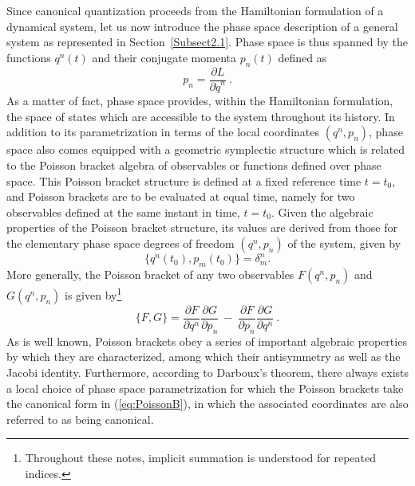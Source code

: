 \documentclass[a4paper,11pt]{article}
\begin{document}
Since canonical quantization proceeds from the Hamiltonian formulation
of a dynamical system, let us now introduce the phase space description
of a general system as represented in Section~\ref{Subsect2.1}. Phase space
is thus spanned by the functions $q^n(t)$ and their conjugate momenta
$p_n(t)$ defined as
\begin{equation}
p_n=\frac{\partial L}{\partial\dot{q}^n}\ .
\end{equation}
As a matter of fact, phase space provides, within the Hamiltonian
formulation, the space of states which are accessible to the system
throughout its history. In addition to its parametrization in terms of
the local coordinates $(q^n,p_n)$, phase space also comes equipped with
a geometric symplectic structure which is related to the Poisson bracket
algebra of observables or functions defined over phase space. This Poisson
bracket structure is defined at a fixed reference time $t=t_0$, and Poisson
brackets are to be evaluated at equal time, namely for two observables
defined at the same instant in time, $t=t_0$. Given the algebraic 
properties of the Poisson bracket structure, its values are derived from 
those for the elementary phase space degrees of freedom $(q^n,p_n)$ of the 
system, given by
\begin{equation}
\{q^n(t_0),p_m(t_0)\}=\delta^n_m .
\label{eq:PoissonB}
\end{equation}
More generally, the Poisson bracket of any two observables $F(q^n,p_n)$ and
$G(q^n,p_n)$ is given by\footnote{Throughout these notes, implicit summation
is understood for repeated indices.}
\begin{equation}
\{F,G\}=\frac{\partial F}{\partial q^n}\frac{\partial G}{\partial p_n}\ -\
\frac{\partial F}{\partial p_n}\frac{\partial G}{\partial q^n}\ .
\end{equation}
As is well known, Poisson brackets obey a series of important algebraic 
pro\-per\-ties by which they are characterized, among which their antisymmetry
as well as the Jacobi identity. Furthermore, according to Darboux's theorem,
there always exists a local choice of phase space parametrization for
which the Poisson brackets take the canonical form in (\ref{eq:PoissonB}),
in which the associated coordinates are also referred to as being canonical.
\end{document}
